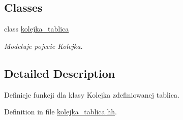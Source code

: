 \subsection*{Classes}
\begin{DoxyCompactItemize}
\item 
class \hyperlink{classkolejka__tablica}{kolejka\-\_\-tablica}
\begin{DoxyCompactList}\small\item\em Modeluje pojecie Kolejka. \end{DoxyCompactList}\end{DoxyCompactItemize}


\subsection{Detailed Description}
Definicje funkcji dla klasy Kolejka zdefiniowanej tablica. 

Definition in file \hyperlink{kolejka__tablica_8hh_source}{kolejka\-\_\-tablica.\-hh}.

